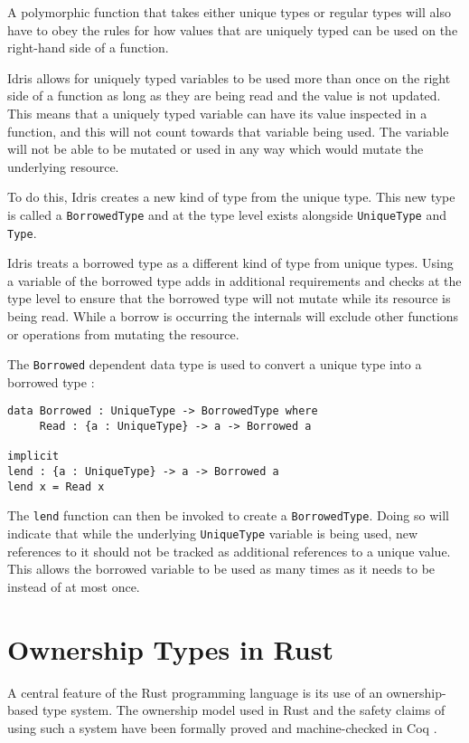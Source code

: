\documentclass[onehalf,11pt]{beavtex}
\begin{document}
A polymorphic function that takes either unique types or regular types will also
have to obey the rules for how values that are uniquely typed can be used
on the right-hand side of a function.

Idris allows for uniquely typed variables to be used more than once on the right
side of a function as long as they are being read and the value is not
updated.
This means that a uniquely typed variable can have its value inspected in a
function, and this will not count towards that variable being used.
The variable will not be able to be mutated or used in any way which would
mutate the underlying resource.

To do this, Idris creates a new kind of type from the unique type.
This new type is called a \texttt{BorrowedType} and at
the type level exists alongside \texttt{UniqueType} and \texttt{Type}.

Idris treats a borrowed type as a different kind of type from unique types.
Using a variable of the borrowed type adds in additional
requirements and checks at the type level to ensure that the borrowed type
will not mutate while its resource is being read.
While a borrow is occurring the internals will exclude other functions or
operations from mutating the resource.

The \texttt{Borrowed} dependent data type is used to convert a unique type into
a borrowed type \cite{idris_uniqueness_types} :

\begin{verbatim}
data Borrowed : UniqueType -> BorrowedType where
     Read : {a : UniqueType} -> a -> Borrowed a

implicit
lend : {a : UniqueType} -> a -> Borrowed a
lend x = Read x
\end{verbatim}

The \texttt{lend} function can then be invoked to create a \texttt{BorrowedType}.
Doing so will indicate that while the underlying \texttt{UniqueType} variable is
being used, new references to it should not be tracked as additional references
to a unique value.  This allows the borrowed variable to be used as many times
as it needs to be instead of at most once. 

\section{Ownership Types in Rust}

A central feature of the Rust programming language is its use of an
ownership-based type system. The ownership model used in Rust and the
safety claims of using such a system have been formally proved and
machine-checked in Coq \cite{Jung:2017:RSF:3177123.3158154}.
\end{document}
